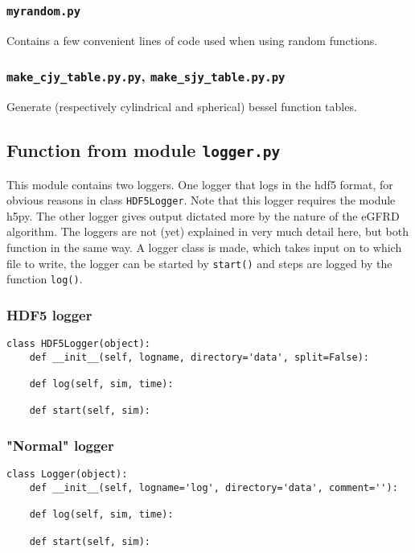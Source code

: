 \documentclass[a4paper,10pt]{article}
\begin{document}
\subsubsection{\texttt{myrandom.py}}
Contains a few convenient lines of code used when using random functions.
 
\subsubsection{\texttt{make\_cjy\_table.py.py}, \texttt{make\_sjy\_table.py.py}}
Generate (respectively cylindrical and spherical) bessel function tables.


\subsection{Function from module \texttt{logger.py}}

This module contains two loggers. One logger that logs in the hdf5 format, for obvious reasons in class \texttt{HDF5Logger}. Note that this logger requires the module h5py. The other logger gives output dictated more by the nature of the eGFRD algorithm.
The loggers are not (yet) explained in very much detail here, but both function in the same way. A logger class is made, which takes input on to which file to write, the logger can be started by \texttt{start()} and steps are logged by the function \texttt{log()}.

\subsubsection{HDF5 logger}

\begin{verbatim}
class HDF5Logger(object):
    def __init__(self, logname, directory='data', split=False):

    def log(self, sim, time):      

    def start(self, sim):
\end{verbatim}

\subsubsection{"Normal" logger}
\begin{verbatim}
class Logger(object):
    def __init__(self, logname='log', directory='data', comment=''):

    def log(self, sim, time):

    def start(self, sim):
\end{verbatim}
\end{document}
